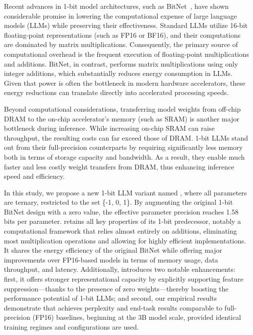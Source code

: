 Recent advances in 1-bit model architectures, such as BitNet~\cite{bitnet}, have shown considerable promise in lowering the computational expense of large language models (LLMs) while preserving their effectiveness. Standard LLMs utilize 16-bit floating-point representations (such as FP16 or BF16), and their computations are dominated by matrix multiplications. Consequently, the primary source of computational overhead is the frequent execution of floating-point multiplications and additions. BitNet, in contrast, performs matrix multiplications using only integer additions, which substantially reduces energy consumption in LLMs. Given that power is often the bottleneck in modern hardware accelerators, these energy reductions can translate directly into accelerated processing speeds.

Beyond computational considerations, transferring model weights from off-chip DRAM to the on-chip accelerator’s memory (such as SRAM) is another major bottleneck during inference. While increasing on-chip SRAM can raise throughput, the resulting costs can far exceed those of DRAM. 1-bit LLMs stand out from their full-precision counterparts by requiring significantly less memory both in terms of storage capacity and bandwidth. As a result, they enable much faster and less costly weight transfers from DRAM, thus enhancing inference speed and efficiency.

In this study, we propose a new 1-bit LLM variant named \textbf{}, where all parameters are ternary, restricted to the set \{-1, 0, 1\}. By augmenting the original 1-bit BitNet design with a zero value, the effective parameter precision reaches 1.58 bits per parameter.  retains all key properties of its 1-bit predecessor, notably a computational framework that relies almost entirely on additions, eliminating most multiplication operations and allowing for highly efficient implementations. It shares the energy efficiency of the original BitNet while offering major improvements over FP16-based models in terms of memory usage, data throughput, and latency. Additionally,  introduces two notable enhancements: first, it offers stronger representational capacity by explicitly supporting feature suppression—thanks to the presence of zero weights—thereby boosting the performance potential of 1-bit LLMs; and second, our empirical results demonstrate that  achieves perplexity and end-task results comparable to full-precision (FP16) baselines, beginning at the 3B model scale, provided identical training regimes and configurations are used.

